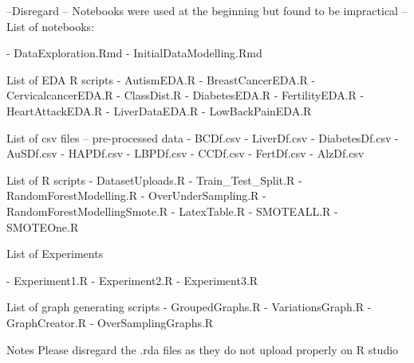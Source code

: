  --Disregard -- Notebooks were used at the beginning but found to be impractical -- List of notebooks:

-  DataExploration.Rmd
- InitialDataModelling.Rmd

 List of EDA R scripts
- AutismEDA.R
- BreastCancerEDA.R
- CervicalcancerEDA.R
- ClassDist.R
- DiabetesEDA.R
- FertilityEDA.R
- HeartAttackEDA.R
- LiverDataEDA.R
- LowBackPainEDA.R

 List of csv files -- pre-processed data
 - BCDf.csv
 - LiverDf.csv
 - DiabetesDf.csv
 - AuSDf.csv
 - HAPDf.csv
 - LBPDf.csv
 - CCDf.csv
 - FertDf.csv
 - AlzDf.csv
 
List of R scripts
 - DatasetUploads.R
 - Train\_Test\_Split.R
 - RandomForestModelling.R
 - OverUnderSampling.R
 - RandomForestModellingSmote.R
 - LatexTable.R
 - SMOTEALL.R
 - SMOTEOne.R
 
 List of Experiments
 
 - Experiment1.R
 - Experiment2.R
 - Experiment3.R
 
 List of graph generating scripts
 - GroupedGraphs.R
 - VariationsGraph.R
 - GraphCreator.R
 - OverSamplingGraphs.R
 
 Notes
Please disregard the .rda files as they do not upload properly on R studio

